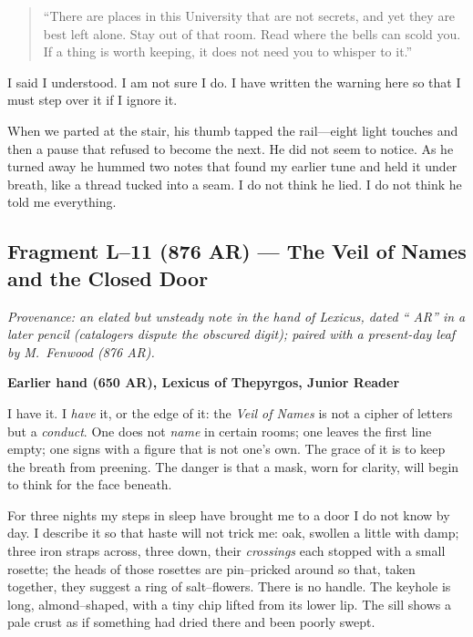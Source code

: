 \documentclass[11pt]{article}
\numberwithin{equation}{section} %
\theoremstyle{plain} %
\theoremstyle{definition} %
\theoremstyle{remark} %
\begin{document}
\begin{quote}\small
“There are places in this University that are not secrets, and yet they are best left alone. Stay out of that room. Read where the bells can scold you. If a thing is worth keeping, it does not need you to whisper to it.”
\end{quote}

I said I understood. I am not sure I do. I have written the warning here so that I must step over it if I ignore it.

When we parted at the stair, his thumb tapped the rail—eight light touches and then a pause that refused to become the next. He did not seem to notice. As he turned away he hummed two notes that found my earlier tune and held it under breath, like a thread tucked into a seam. I do not think he lied. I do not think he told me everything.

\subsection{Fragment L--11 (876 AR)  — The Veil of Names and the Closed Door}
\label{frag:l11}

\noindent\textit{Provenance: an elated but unsteady note in the hand of Lexicus, dated “ AR” in a later pencil (catalogers dispute the obscured digit); paired with a present-day leaf by M.\ Fenwood (876 AR).}

\medskip
\noindent\textbf{Earlier hand (650 AR), Lexicus of Thepyrgos, Junior Reader}

I have it. I \emph{have} it, or the edge of it: the \textit{Veil of Names} is not a cipher of letters but a \emph{conduct}. One does not \emph{name} in certain rooms; one leaves the first line empty; one signs with a figure that is not one’s own. The grace of it is to keep the breath from preening. The danger is that a mask, worn for clarity, will begin to think for the face beneath.

For three nights my steps in sleep have brought me to a door I do not know by day. I describe it so that haste will not trick me: oak, swollen a little with damp; three iron straps across, three down, their \emph{crossings} each stopped with a small rosette; the heads of those rosettes are pin–pricked around so that, taken together, they suggest a ring of salt–flowers. There is no handle. The keyhole is long, almond–shaped, with a tiny chip lifted from its lower lip. The sill shows a pale crust as if something had dried there and been poorly swept.
\end{document}
